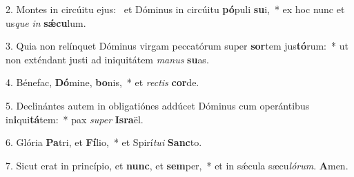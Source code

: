 2. Montes in circúitu ejus: \dag\  et Dóminus in circúitu \textbf{pó}puli \textbf{su}i,~*  ex hoc nunc et us\textit{que} \textit{in} \textbf{sǽ}\textbf{cu}lum.\

3. Quia non relínquet Dóminus virgam peccatórum super \textbf{sor}tem jus\textbf{tó}rum:~*  ut non exténdant justi ad iniquitátem \textit{ma}\textit{nus} \textbf{su}as.\

4. Bénefac, \textbf{Dó}mine, \textbf{bo}nis,~*  et \textit{rec}\textit{tis} \textbf{cor}de.\

5. Declinántes autem in obligatiónes addúcet Dóminus cum operántibus in\textbf{i}qui\textbf{tá}tem:~*  pax \textit{su}\textit{per} \textbf{Is}\textbf{ra}ël.\

6. Glória \textbf{Pa}tri, et \textbf{Fí}lio,~*  et Spirí\textit{tu}\textit{i} \textbf{Sanc}to.\

7. Sicut erat in princípio, et \textbf{nunc}, et \textbf{sem}per,~*  et in sǽcula sæcu\textit{ló}\textit{rum}. \textbf{A}men.\

